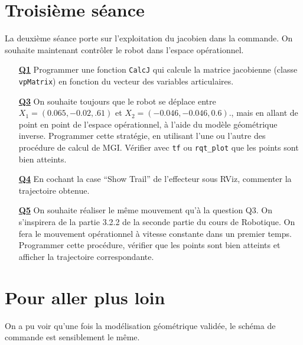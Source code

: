 \documentclass[12pt,a4paper]{article}
\begin{document}
\newpage

\section{Troisième séance}

La deuxième séance porte sur l'exploitation du jacobien dans la commande. On souhaite maintenant contrôler le robot dans l'espace opérationnel.

\begin{itemize}
 \medskip\item[\textbf{\underline{Q1}}] Programmer une fonction \texttt{CalcJ} qui calcule la matrice jacobienne (classe \texttt{vpMatrix}) en fonction du vecteur des variables articulaires.
 
 \medskip\item[\textbf{\underline{Q3}}] On souhaite toujours que le robot se déplace entre $X_1=(0.065,-0.02,.61)$ et $X_2=(-0.046, -0.046,  0.6)$., mais en allant de point en point de l'espace opérationnel, à l'aide du modèle géométrique inverse.
Programmer cette stratégie, en utilisant l'une ou l'autre des procédure de calcul de MGI.
 Vérifier avec  \texttt{tf} ou  \texttt{rqt\_plot} que les points sont bien atteints.
 
 
 \medskip\item[\textbf{\underline{Q4}}] En cochant la case ``Show Trail'' de l'effecteur sous RViz, commenter la trajectoire obtenue.
 
 \medskip\item[\textbf{\underline{Q5}}] On souhaite réaliser le même mouvement qu'à la question Q3.
 On s'inspirera de la partie 3.2.2 de la seconde partie du cours de Robotique. On fera le mouvement opérationnel à vitesse constante dans un premier temps. Programmer cette procédure, vérifier que les points sont bien atteints et afficher la trajectoire correspondante.
  

 \end{itemize}
 
 \newpage
\section{Pour aller plus loin}
 
 On a pu voir qu'une fois la modélisation géométrique validée, le schéma de commande est sensiblement le même. 
\end{document}
